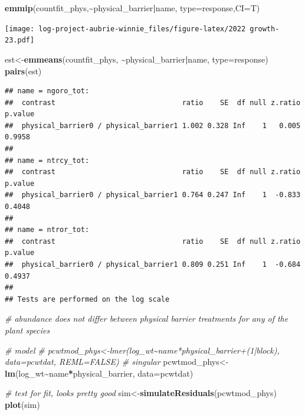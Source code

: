 \documentclass[
]{article}
\newenvironment{Shaded}{\begin{snugshade}}{\end{snugshade}}
\newcommand{\AttributeTok}[1]{\textcolor[rgb]{0.13,0.29,0.53}{#1}}
\newcommand{\CommentTok}[1]{\textcolor[rgb]{0.56,0.35,0.01}{\textit{#1}}}
\newcommand{\FunctionTok}[1]{\textcolor[rgb]{0.13,0.29,0.53}{\textbf{#1}}}
\newcommand{\NormalTok}[1]{#1}
\newcommand{\OtherTok}[1]{\textcolor[rgb]{0.56,0.35,0.01}{#1}}
\newcommand{\SpecialCharTok}[1]{\textcolor[rgb]{0.81,0.36,0.00}{\textbf{#1}}}
\newcommand{\StringTok}[1]{\textcolor[rgb]{0.31,0.60,0.02}{#1}}
\begin{document}
\begin{Shaded}
\begin{Highlighting}[]
\FunctionTok{emmip}\NormalTok{(countfit\_phys,}\SpecialCharTok{\textasciitilde{}}\NormalTok{physical\_barrier}\SpecialCharTok{|}\NormalTok{name, }\AttributeTok{type=}\StringTok{\textquotesingle{}response\textquotesingle{}}\NormalTok{,}\AttributeTok{CI=}\NormalTok{T)}
\end{Highlighting}
\end{Shaded}

\texttt{[image: log-project-aubrie-winnie\_files/figure-latex/2022 growth-23.pdf]}

\begin{Shaded}
\begin{Highlighting}[]
\NormalTok{est}\OtherTok{\textless{}{-}}\FunctionTok{emmeans}\NormalTok{(countfit\_phys, }\SpecialCharTok{\textasciitilde{}}\NormalTok{physical\_barrier}\SpecialCharTok{|}\NormalTok{name, }\AttributeTok{type=}\StringTok{\textquotesingle{}response\textquotesingle{}}\NormalTok{)}
\FunctionTok{pairs}\NormalTok{(est)}
\end{Highlighting}
\end{Shaded}

\begin{verbatim}
## name = ngoro_tot:
##  contrast                              ratio    SE  df null z.ratio p.value
##  physical_barrier0 / physical_barrier1 1.002 0.328 Inf    1   0.005  0.9958
## 
## name = ntrcy_tot:
##  contrast                              ratio    SE  df null z.ratio p.value
##  physical_barrier0 / physical_barrier1 0.764 0.247 Inf    1  -0.833  0.4048
## 
## name = ntror_tot:
##  contrast                              ratio    SE  df null z.ratio p.value
##  physical_barrier0 / physical_barrier1 0.809 0.251 Inf    1  -0.684  0.4937
## 
## Tests are performed on the log scale
\end{verbatim}

\begin{Shaded}
\begin{Highlighting}[]
\CommentTok{\# abundance does not differ between physical barrier treatments for any of the plant species}


\CommentTok{\# model}
\CommentTok{\# pcwtmod\_phys\textless{}{-}lmer(log\_wt\textasciitilde{}name*physical\_barrier+(1|block), data=pcwtdat, REML=FALSE) \# singular }
\NormalTok{pcwtmod\_phys}\OtherTok{\textless{}{-}}\FunctionTok{lm}\NormalTok{(log\_wt}\SpecialCharTok{\textasciitilde{}}\NormalTok{name}\SpecialCharTok{*}\NormalTok{physical\_barrier, }\AttributeTok{data=}\NormalTok{pcwtdat) }


\CommentTok{\# test for fit, looks pretty good}
\NormalTok{ sim}\OtherTok{\textless{}{-}}\FunctionTok{simulateResiduals}\NormalTok{(pcwtmod\_phys)}
 \FunctionTok{plot}\NormalTok{(sim)}
\end{Highlighting}
\end{Shaded}
\end{document}
